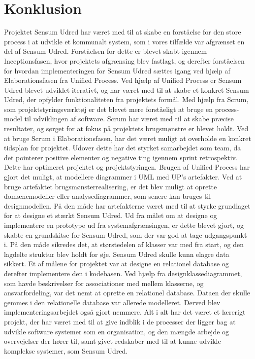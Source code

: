 \documentclass[../main.tex]{subfiles}
\begin{document}
\section{Konklusion}

Projektet Sensum Udred har været med til at skabe en forståelse for den store process i at udvikle et kommunalt system, som i vores tilfælde var afgrænset en del af Sensum Udred. Forståelsen for dette er blevet skabt igennem Inceptionsfasen, hvor projektets afgrænsing blev fastlagt, og derefter forståelsen for hvordan implementeringen for Sensum Udred sættes igang ved hjælp af Elaborationsfasen fra Unified Process. Ved hjælp af Unified Process er Sensum Udred blevet udviklet iterativt, og har været med til at skabe et konkret Sensum Udred, der opfylder funktionaliteten fra projektets formål. Med hjælp fra Scrum, som projektstyringsværktøj er det blevet mere forståeligt at bruge en process-model til udviklingen af software. Scrum har været med til at skabe præcise resultater, og sørget for at fokus på projektets brugsmønstre er blevet holdt. Ved at bruge Scrum i Elaborationsfasen, har det været muligt at overholde en konkret tidsplan for projektet. Udover dette har det styrket samarbejdet som team, da det pointerer positive elementer og negative ting igennem sprint retrospektiv. Dette har optimeret projektet og projektstyringen. 
Brugen af Unified Process har gjort det muligt, at modellere diagrammer i UML med UP's artefakter. Ved at bruge artefaktet brugsmønsterrealisering, er det blev muligt at oprette domænemodeller eller analysediagrammer, som senere kan bruges til designmodellen. På den måde har artefakterne været med til at styrke grundlaget for at designe et stærkt Sensum Udred. Ud fra målet om at designe og implementere en prototype ud fra systemafgrænsingen, er dette blevet gjort, og skabte en grundskitse for Sensum Udred, som der var god at tage udgangspunkt i. På den måde sikredes det, at størstedelen af klasser var med fra start, og den lagdelte struktur blev holdt for øje. Sensum Udred skulle kunn elagre data sikkert. Et af målene for projektet var at designe en relationel database og derefter implementere den i kodebasen. Ved hjælp fra designklassediagrammet, som havde beskrivelser for associationer med mellem klasserne, og ansvarfordeling, var det nemt at oprette en relationel database. Dataen der skulle gemmes i den relationelle database var allerede modelleret. Derved blev implementeringsarbejdet også gjort nemmere. Alt i alt har det været et lærerigt projekt, der har været med til at give indblik i de processer der ligger bag at udvikle software systemer som en organisation, og den mængde arbejde og overvejelser der hører til, samt givet redskaber med til at kunne udvikle komplekse systemer, som Sensum Udred.
\end{document}
